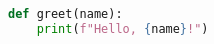 \begin{lstlisting}[language=Python, caption={Example Python Code}]
def greet(name):
    print(f"Hello, {name}!")
\end{lstlisting}